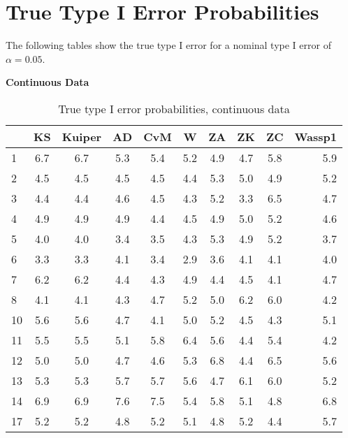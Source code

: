 \documentclass[]{svjour3}
\begin{document}
\section{True Type I Error Probabilities}

The following tables show the true type I error for a nominal type I error of \(\alpha=0.05\).

\textbf{Continuous Data}

\begin{table}[H]
\begin{center}
\caption{True type I error probabilities, continuous data}
\label{tab:table2}
\begin{tabular}{l|c|c|c|c|c|c|c|c|r}
 & KS & Kuiper & AD & CvM &  W & ZA & ZK & ZC & Wassp1\\
\hline
1 & 6.7 &    6.7 & 5.3 & 5.4 & 5.2 & 4.9 & 4.7 & 5.8 & 5.9\\
2 & 4.5 &    4.5 & 4.5 & 4.5 & 4.4 & 5.3 & 5.0 & 4.9 & 5.2\\
3 & 4.4 &    4.4 & 4.6 & 4.5 & 4.3 & 5.2 & 3.3 & 6.5 & 4.7\\
4 & 4.9 &    4.9 & 4.9 & 4.4 & 4.5 & 4.9 & 5.0 & 5.2 & 4.6\\
5 & 4.0 &    4.0 & 3.4 & 3.5 & 4.3 & 5.3 & 4.9 & 5.2 & 3.7\\
6 & 3.3 &    3.3 & 4.1 & 3.4 & 2.9 & 3.6 & 4.1 & 4.1 & 4.0\\
7 & 6.2 &    6.2 & 4.4 & 4.3 & 4.9 & 4.4 & 4.5 & 4.1 & 4.7\\
8 & 4.1 &    4.1 & 4.3 & 4.7 & 5.2 & 5.0 & 6.2 & 6.0 & 4.2\\
10 & 5.6 &    5.6 & 4.7 & 4.1 & 5.0 & 5.2 & 4.5 & 4.3 & 5.1\\
11 & 5.5 &    5.5 & 5.1 & 5.8 & 6.4 & 5.6 & 4.4 & 5.4 & 4.2\\
12 & 5.0 &    5.0 & 4.7 & 4.6 & 5.3 & 6.8 & 4.4 & 6.5 & 5.6\\
13 & 5.3 &    5.3 & 5.7 & 5.7 & 5.6 & 4.7 & 6.1 & 6.0 & 5.2\\
14 & 6.9 &    6.9 & 7.6 & 7.5 & 5.4 & 5.8 & 5.1 & 4.8 & 6.8 \\
17 & 5.2 &    5.2 & 4.8 & 5.2 & 5.1 & 4.8 & 5.2 & 4.4 & 5.7
\end{tabular}
\end{center}
\end{table}
\end{document}

